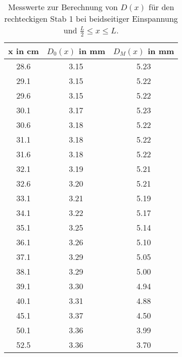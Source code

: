 \begin{table}
  \centering
  \begin{tabular}{c c c}
    \toprule
    x in \si{\centi\meter} & $D_0(x)$ in \si{\milli\meter} & $D_M(x)$ in \si{\milli\meter} \\
    \midrule
    28.6 & 3.15 & 5.23 \\
    29.1 & 3.15 & 5.22 \\
    29.6 & 3.15 & 5.22 \\
    30.1 & 3.17 & 5.23 \\
    30.6 & 3.18 & 5.22 \\
    31.1 & 3.18 & 5.22 \\
    31.6 & 3.18 & 5.22 \\
    32.1 & 3.19 & 5.21 \\
    32.6 & 3.20 & 5.21 \\
    33.1 & 3.21 & 5.19 \\
    34.1 & 3.22 & 5.17 \\
    35.1 & 3.25 & 5.14 \\
    36.1 & 3.26 & 5.10 \\
    37.1 & 3.29 & 5.05 \\
    38.1 & 3.29 & 5.00 \\
    39.1 & 3.30 & 4.94 \\
    40.1 & 3.31 & 4.88 \\
    45.1 & 3.37 & 4.50 \\
    50.1 & 3.36 & 3.99 \\
    52.5 & 3.36 & 3.70 \\
    \bottomrule
  \end{tabular}
  \caption{Messwerte zur Berechnung von $D(x)$ für den rechteckigen Stab 1 bei
  beidseitiger Einspannung und $\frac{L}{2}\leq x \leq L$.}
  \label{tab:messung3b}
\end{table}

